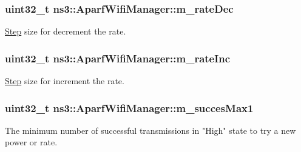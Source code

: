 \subsubsection[{\texorpdfstring{m\+\_\+rate\+Dec}{m_rateDec}}]{\setlength{\rightskip}{0pt plus 5cm}uint32\+\_\+t ns3\+::\+Aparf\+Wifi\+Manager\+::m\+\_\+rate\+Dec\hspace{0.3cm}{\ttfamily [private]}}\hypertarget{classns3_1_1AparfWifiManager_a829dd14adfa5d780b324f7dca7f37362}{}\label{classns3_1_1AparfWifiManager_a829dd14adfa5d780b324f7dca7f37362}


\hyperlink{structStep}{Step} size for decrement the rate. 

\subsubsection[{\texorpdfstring{m\+\_\+rate\+Inc}{m_rateInc}}]{\setlength{\rightskip}{0pt plus 5cm}uint32\+\_\+t ns3\+::\+Aparf\+Wifi\+Manager\+::m\+\_\+rate\+Inc\hspace{0.3cm}{\ttfamily [private]}}\hypertarget{classns3_1_1AparfWifiManager_a46d7ecaf54a04e145e4be183c042a65e}{}\label{classns3_1_1AparfWifiManager_a46d7ecaf54a04e145e4be183c042a65e}


\hyperlink{structStep}{Step} size for increment the rate. 

\subsubsection[{\texorpdfstring{m\+\_\+succes\+Max1}{m_succesMax1}}]{\setlength{\rightskip}{0pt plus 5cm}uint32\+\_\+t ns3\+::\+Aparf\+Wifi\+Manager\+::m\+\_\+succes\+Max1\hspace{0.3cm}{\ttfamily [private]}}\hypertarget{classns3_1_1AparfWifiManager_ab192aa4160ffefa93e47301ad682ccaa}{}\label{classns3_1_1AparfWifiManager_ab192aa4160ffefa93e47301ad682ccaa}


The minimum number of successful transmissions in "High" state to try a new power or rate. 

